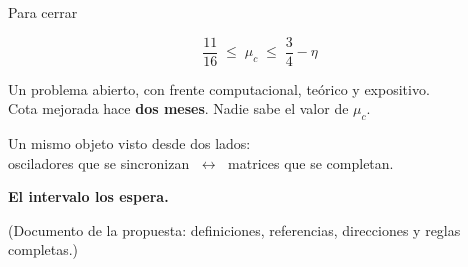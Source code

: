 \documentclass[10pt,aspectratio=169]{beamer}
\begin{document}
\begin{frame}{Para cerrar}
\begin{center}
{\Large
\[
\frac{11}{16} \;\le\; \mu_c \;\le\; \frac{3}{4} - \eta
\]}
\bigskip

Un problema abierto, con frente computacional, teórico y expositivo.\\

Cota mejorada hace \textbf{dos meses}. Nadie sabe el valor de $\mu_c$.
\bigskip
\pause

Un mismo objeto visto desde dos lados:\\
osciladores que se sincronizan $\;\longleftrightarrow\;$ matrices que se completan.
\bigskip
\pause

{\large \textbf{El intervalo los espera.}}
\bigskip

\normalsize (Documento de la propuesta: definiciones, referencias, direcciones y reglas completas.)
\end{center}
\end{frame}
\end{document}
